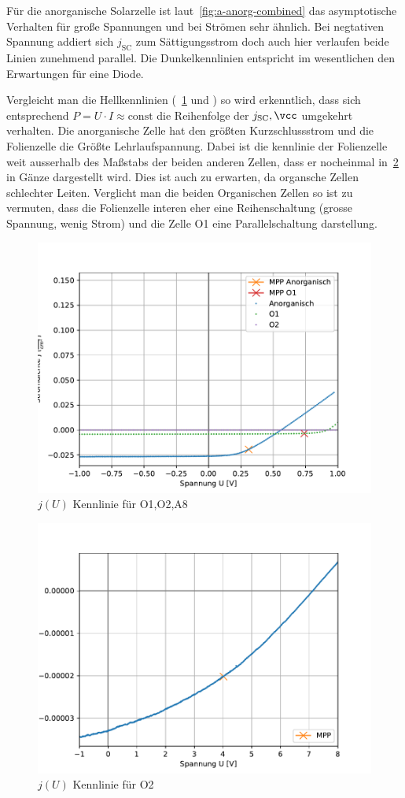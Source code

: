 \documentclass[slug=SZ, room=Hermann-Krone-Bau\,\ Labor\ 1.25, supervisor=Martin\ Kroll]{../../Lab_Report_LaTeX/lab_report}
\newcommand{\jsc}{j_{\text{SC}}}
\begin{document}
F\"ur die anorganische Solarzelle ist laut~\ref{fig:a-anorg-combined}
das asymptotische Verhalten f\"ur gro\ss{}e Spannungen und bei
Str\"omen sehr \"ahnlich. Bei negtativen Spannung addiert sich
\(\jsc\) zum S\"attigungsstrom doch auch hier verlaufen beide Linien
zunehmend parallel. Die Dunkelkennlinien entspricht im wesentlichen
den Erwartungen f\"ur eine Diode.

Vergleicht man die Hellkennlinien (~\ref{fig:a-all-combined} und ) so wird
erkenntlich, dass sich entsprechend
\(P=U\cdot I \approx \text{const}\) die Reihenfolge der \(\jsc, \vcc\)
umgekehrt verhalten. Die anorganische Zelle hat den gr\"o\ss{}ten
Kurzschlussstrom und die Folienzelle die Gr\"o\ss{}te
Lehrlaufspannung. Dabei ist die kennlinie der Folienzelle weit
ausserhalb des Ma\ss{}stabs der beiden anderen Zellen, dass er
nocheinmal in~\ref{fig:a-fol-light} in G\"anze dargestellt wird.
Dies ist auch zu erwarten, da organsche Zellen
schlechter Leiten. Verglicht man die beiden Organischen
Zellen so ist zu vermuten, dass die Folienzelle interen eher eine
Reihenschaltung (grosse Spannung, wenig Strom) und die Zelle
O1 eine Parallelschaltung darstellung.


\begin{figure}[H]\centering
  \includegraphics[width=.7\columnwidth]{./figs/python/A/all_combined.pdf}
  \caption{\(j(U)\) Kennlinie f\"ur O1,O2,A8}
  \label{fig:a-all-combined}
\end{figure}
\begin{figure}[H]\centering
  \includegraphics[width=.7\columnwidth]{./figs/python/A/fol_hell.pdf}
  \caption{\(j(U)\) Kennlinie f\"ur O2}
  \label{fig:a-fol-light}
\end{figure}
\end{document}
